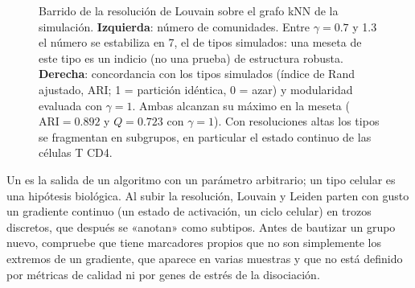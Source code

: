 \begin{figure}[t]
\centering
{}
\caption[Efecto de la resolución en Louvain]{Barrido de la resolución de Louvain sobre el grafo kNN de la simulación. \textbf{Izquierda}: número de comunidades. Entre $\gamma=\num{0.7}$ y \num{1.3} el número se estabiliza en 7, el de tipos simulados: una meseta de este tipo es un indicio (no una prueba) de estructura robusta. \textbf{Derecha}: concordancia con los tipos simulados (índice de Rand ajustado, ARI; 1 = partición idéntica, 0 = azar) y modularidad evaluada con $\gamma=1$. Ambas alcanzan su máximo en la meseta ($\mathrm{ARI}=\num{0.892}$ y $Q=\num{0.723}$ con $\gamma=1$). Con resoluciones altas los tipos se fragmentan en subgrupos, en particular el estado continuo de las células T CD4.}
\label{fig:12-resolucion}
\end{figure}

\begin{cuidado}
Un  es la salida de un algoritmo con un parámetro arbitrario; un tipo celular es una hipótesis biológica. Al subir la resolución, Louvain y Leiden parten con gusto un gradiente continuo (un estado de activación, un ciclo celular) en trozos discretos, que después se «anotan» como subtipos. Antes de bautizar un grupo nuevo, compruebe que tiene marcadores propios que no son simplemente los extremos de un gradiente, que aparece en varias muestras y que no está definido por métricas de calidad ni por genes de estrés de la disociación.
\end{cuidado}

